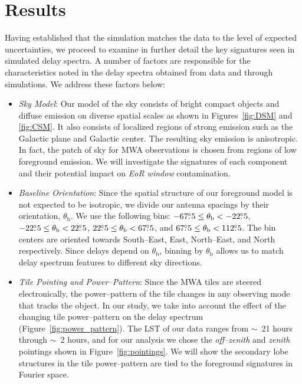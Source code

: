 \documentclass[preprint2,iop,numberedappendix]{emulateapj}
\begin{document}
\section{Results}\label{sec:delay-spectrum-analysis}

Having established that the simulation matches the data to the level of expected uncertainties, we proceed to examine in further detail the key signatures seen in simulated delay spectra. A number of factors are responsible for the characteristics noted in the delay spectra obtained from data and through simulations. We address these factors below: 

\begin{itemize}

\item {\it Sky Model}: Our model of the sky consists of bright compact objects and diffuse emission on diverse spatial scales as shown in Figures~\ref{fig:DSM} and \ref{fig:CSM}. It also consists of localized regions of strong emission such as the Galactic plane and Galactic center. The resulting sky emission is anisotropic. In fact, the patch of sky for MWA observations is chosen from regions of low foreground emission. We will investigate the signatures of each component and their potential impact on {\it EoR window} contamination.

\item {\it Baseline Orientation}: Since the spatial structure of our foreground model is not expected to be isotropic, we divide our antenna spacings by their orientation, $\theta_\textrm{b}$. We use the following bins: $-67\mbox{$.\!\!^\circ$} 5\le \theta_\textrm{b} < -22\mbox{$.\!\!^\circ$} 5$, $-22\mbox{$.\!\!^\circ$} 5\le \theta_\textrm{b} < 22\mbox{$.\!\!^\circ$} 5$, $22\mbox{$.\!\!^\circ$} 5\le \theta_\textrm{b} < 67\mbox{$.\!\!^\circ$} 5$, and $67\mbox{$.\!\!^\circ$} 5\le \theta_\textrm{b} < 112\mbox{$.\!\!^\circ$} 5$. The bin centers are oriented towards South--East, East, North--East, and North respectively. Since delays depend on $\theta_\textrm{b}$, binning by $\theta_\textrm{b}$ allows us to match delay spectrum features to different sky directions.

\item {\it Tile Pointing and Power--Pattern}: Since the MWA tiles are steered electronically, the power--pattern of the tile changes in any observing mode that tracks the object. In our study, we take into account the effect of the changing tile power--pattern on the delay spectrum (Figure~\ref{fig:power_pattern}). The LST of our data ranges from $\sim$~21 hours through $\sim$~2 hours, and for our analysis we chose the {\it off--zenith} and {\it zenith} pointings shown in Figure~\ref{fig:pointings}. We will show the secondary lobe structures in the tile power--pattern are tied to the foreground signatures in Fourier space. 


\end{itemize}
\end{document}
